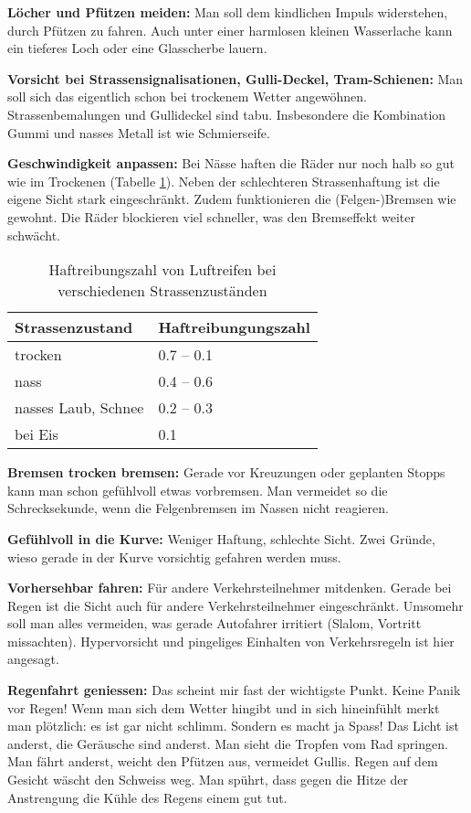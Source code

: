 \textbf{Löcher und Pfützen meiden:}
Man soll dem kindlichen Impuls widerstehen, durch Pfützen zu fahren.
Auch unter einer harmlosen kleinen Wasserlache kann ein tieferes Loch oder eine Glasscherbe lauern.

\textbf{Vorsicht bei Strassensignalisationen, Gulli-Deckel, Tram-Schienen:}
Man soll sich das eigentlich schon bei trockenem Wetter angewöhnen.
Strassenbemalungen und Gullideckel sind tabu.
Insbesondere die Kombination Gummi und nasses Metall ist wie Schmierseife.

\textbf{Geschwindigkeit anpassen:}
Bei Nässe haften die Räder nur noch halb so gut wie im Trockenen (Tabelle \ref{tab:haftreibung}).
Neben der schlechteren Strassenhaftung ist die eigene Sicht stark eingeschränkt.
Zudem funktionieren die (Felgen-)Bremsen wie gewohnt.
Die Räder blockieren viel schneller, was den Bremseffekt weiter schwächt.

\begin{table}
  \centering
  \begin{tabular}{ll}
    \toprule
    Strassenzustand & Haftreibungungszahl \\
    \midrule
    trocken         & 0.7 -- 0.1 \\
    nass            & 0.4 -- 0.6 \\
    nasses Laub, Schnee & 0.2 -- 0.3 \\
    bei Eis         & 0.1 \\
    \bottomrule
  \end{tabular}
  \caption{Haftreibungszahl von Luftreifen bei verschiedenen Strassenzuständen \cite{Strommer2016haftreibung}}
  \label{tab:haftreibung}
\end{table}


\textbf{Bremsen trocken bremsen:}
Gerade vor Kreuzungen oder geplanten Stopps kann man schon gefühlvoll etwas vorbremsen.
Man vermeidet so die Schrecksekunde, wenn die Felgenbremsen im Nassen nicht reagieren.

\textbf{Gefühlvoll in die Kurve:}
Weniger Haftung, schlechte Sicht.
Zwei Gründe, wieso gerade in der Kurve vorsichtig gefahren werden muss.

\textbf{Vorhersehbar fahren:}
Für andere Verkehrsteilnehmer mitdenken.
Gerade bei Regen ist die Sicht auch für andere Verkehrsteilnehmer eingeschränkt.
Umsomehr soll man alles vermeiden, was gerade Autofahrer irritiert (Slalom, Vortritt missachten).
Hypervorsicht und pingeliges Einhalten von Verkehrsregeln ist hier angesagt.

\textbf{Regenfahrt geniessen:}
Das scheint mir fast der wichtigste Punkt.
Keine Panik vor Regen!
Wenn man sich dem Wetter hingibt und in sich hineinfühlt merkt man plötzlich: es ist gar nicht schlimm.
Sondern es macht ja Spass!
Das Licht ist anderst, die Geräusche sind anderst. Man sieht die Tropfen vom Rad springen.
Man fährt anderst, weicht den Pfützen aus, vermeidet Gullis.
Regen auf dem Gesicht wäscht den Schweiss weg.
Man spührt, dass gegen die Hitze der Anstrengung die Kühle des Regens einem gut tut.

